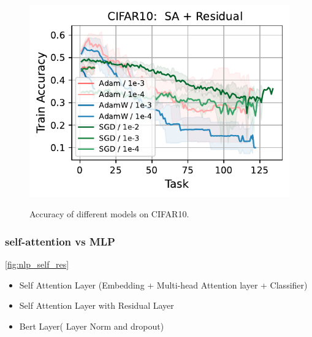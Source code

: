 \begin{figure}[t]
{    \includegraphics[width=\textwidth]{figs/Accuracy/image/attention_residual/cifar10_40.pdf}
    }
    \caption{Accuracy of different models on CIFAR10.}
    \label{fig:image_models}
\end{figure}



\subsubsection{self-attention vs MLP}

\autoref{fig:nlp_self_res}
\begin{itemize}
    \item Self Attention Layer (Embedding + Multi-head Attention layer + Classifier)
    \item Self Attention Layer  with Residual Layer
    \item Bert Layer( Layer Norm and dropout)
\end{itemize}


